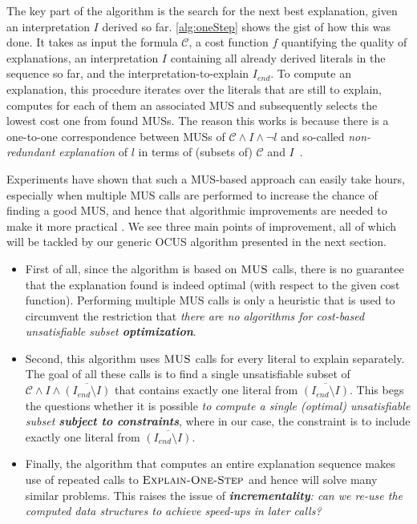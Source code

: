 \documentclass[twoside,11pt]{article}
\newcommand\m[1]{\mathcal{#1}}
\newcommand\Iend{\ensuremath{I_\mathit{end} }\xspace}
\newcommand\formulac{\ensuremath{\m{C} }\xspace}
\newcommand\mm[1]{\ensuremath{#1}\xspace}
\newcommand\call[1]{\mm{\textsc{#1}}}
\newcommand\onestep{\ensuremath{\call{Explain-One-Step}}\xspace}
\begin{document}
The key part of the algorithm is the search for the next best explanation, given an interpretation $I$ derived so far. 
\cref{alg:oneStep} shows the gist of how this was done.
It takes as input the formula \formulac, a cost function $f$ quantifying the quality of explanations, an interpretation $I$ containing all already derived literals in the sequence so far, and the interpretation-to-explain $\Iend$. 
To compute an explanation, this procedure iterates over the literals that are still to explain, computes for each of them an associated MUS and subsequently selects the lowest cost one from found MUSs.
The reason this works is because there is a one-to-one correspondence between MUSs of $\formulac \land I \land \neg l$ and so-called \emph{non-redundant explanation} of $l$ in terms of (subsets of) $\formulac$ and $I$~\cite{ecai/BogaertsGCG20}. 

Experiments have shown that such a MUS-based approach can easily take hours, especially when multiple MUS calls are performed to increase the chance of finding a good MUS, and hence that algorithmic improvements are needed to make it more practical \cite{bogaerts2021framework}. 
We see three main points of improvement, all of which will be tackled by our generic OCUS algorithm presented in the next section. 

\begin{itemize}
\item First of all, since the algorithm is based on \call{MUS} calls, there is no guarantee that the explanation found is indeed optimal %
	  (with respect to the given cost function). 
	  Performing multiple MUS calls is only a heuristic that is used to circumvent the restriction that \textit{there are no algorithms for cost-based unsatisfiable subset \textbf{optimization}}. 
\item Second, this algorithm uses \call{MUS} calls for every literal to explain separately. The goal of all these calls is to find a single unsatisfiable subset of $\formulac \land I \land \overline{(\Iend\setminus I)}$ that contains exactly one literal from $\overline{(\Iend\setminus I)}$. This begs the questions whether it is possible \textit{to compute a single (optimal) unsatisfiable subset \textbf{subject to constraints}}, where in our case, the constraint is to include exactly one literal from $\overline{(\Iend\setminus I)}$. 
\item Finally, the algorithm that computes an entire explanation sequence makes use of repeated calls to \onestep and hence will solve many similar problems. This raises the issue of \textit{\textbf{incrementality}: can we re-use the computed data structures to achieve speed-ups in later calls?}
\end{itemize}
\end{document}
